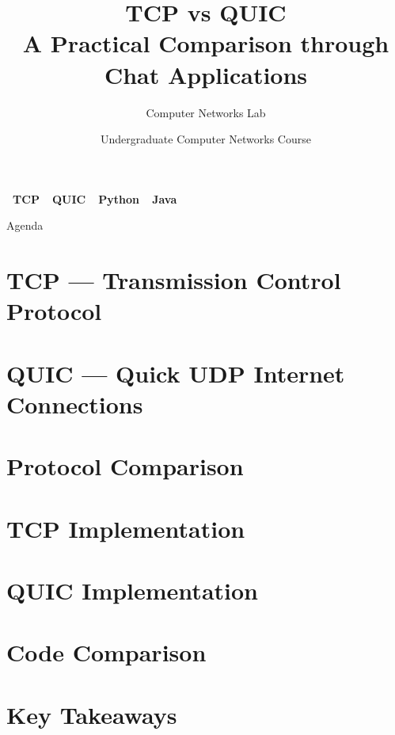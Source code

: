 \documentclass[aspectratio=169]{beamer}
\title[TCP vs QUIC]{\textbf{TCP vs QUIC}\\A Practical Comparison through Chat Applications}
\subtitle{Computer Networks Lab}
\author{Undergraduate Computer Networks Course}
\date{}
\newcommand{\tcpbadge}{\colorbox{tcpcolor}{\color{white}\tiny\textbf{~TCP~}}}
\newcommand{\quicbadge}{\colorbox{quiccolor}{\color{white}\tiny\textbf{~QUIC~}}}
\newcommand{\pybadge}{\colorbox{violet!70!black}{\color{white}\tiny\textbf{~Python~}}}
\newcommand{\javabadge}{\colorbox{orange!70!black}{\color{white}\tiny\textbf{~Java~}}}
\begin{document}

\begin{frame}
\titlepage
\vspace{-1em}
\begin{center}
  \tcpbadge\quad\quicbadge\quad\pybadge\quad\javabadge
\end{center}
\end{frame}

\begin{frame}{Agenda}
  \tableofcontents
\end{frame}

\section{TCP --- Transmission Control Protocol}
\section{QUIC --- Quick UDP Internet Connections}
\section{Protocol Comparison}
\section{TCP Implementation}
\section{QUIC Implementation}
\section{Code Comparison}
\section{Key Takeaways}
\end{document}
